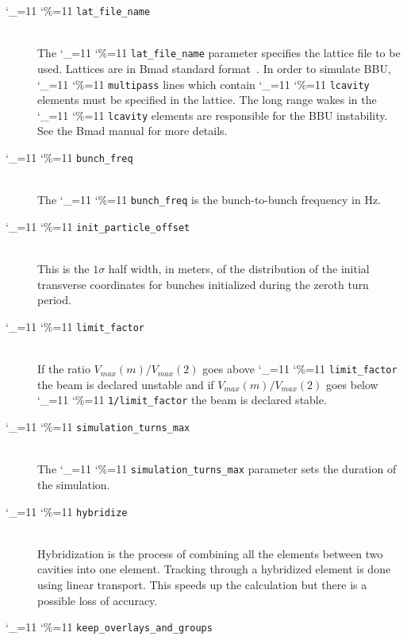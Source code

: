\documentclass[11pt]{article}
\newcommand\ttcmd{\begingroup\catcode`\_=11 \catcode`\%=11 \dottcmd}
\newcommand\dottcmd[1]{\texttt{#1}\endgroup}
\newcommand{\vn}{\ttcmd}
\newcommand{\Newline}{\hfil \\}
\begin{document}
{  \begin{description}
  \item[\vn{lat_file_name}] \Newline
The \vn{lat_file_name} parameter specifies the lattice file to be
used.  Lattices are in Bmad standard format~\cite{ref:bmad}. In order
to simulate BBU, \vn{multipass} lines which contain \vn{lcavity}
elements must be specified in the lattice. The long range wakes in the
\vn{lcavity} elements are responsible for the BBU instability. See
the Bmad manual for more details.
  \item[\vn{bunch_freq}] \Newline
The \vn{bunch_freq} is the bunch-to-bunch frequency in Hz.
  \item[\vn{init_particle_offset}] \Newline
This is the $1\sigma$ half width, in meters, of the distribution of
the initial transverse coordinates for bunches initialized during the
zeroth turn period.
  \item[\vn{limit_factor}] \Newline
If the ratio $V_{max}(m)/V_{max}(2)$ goes above \vn{limit_factor} the
beam is declared unstable and if $V_{max}(m)/V_{max}(2)$ goes below
\vn{1/limit_factor} the beam is declared stable.
  \item[\vn{simulation_turns_max}] \Newline
The \vn{simulation_turns_max} parameter sets the duration of the simulation.
  \item[\vn{hybridize}] \Newline
Hybridization is the process of combining all the elements between
two cavities into one element. Tracking through a hybridized element
is done using linear transport. This speeds up the calculation but
there is a possible loss of accuracy.
  \item[\vn{keep_overlays_and_groups}] \Newline


\end{description}}
\end{document}
